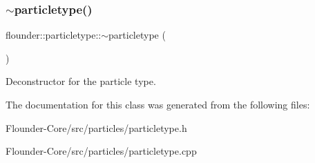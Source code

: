 \subsubsection{\texorpdfstring{$\sim$particletype()}{~particletype()}}
{\footnotesize\ttfamily flounder\+::particletype\+::$\sim$particletype (\begin{DoxyParamCaption}{ }\end{DoxyParamCaption})}



Deconstructor for the particle type. 



The documentation for this class was generated from the following files\+:\begin{DoxyCompactItemize}
\item 
Flounder-\/\+Core/src/particles/particletype.\+h\item 
Flounder-\/\+Core/src/particles/particletype.\+cpp\end{DoxyCompactItemize}
